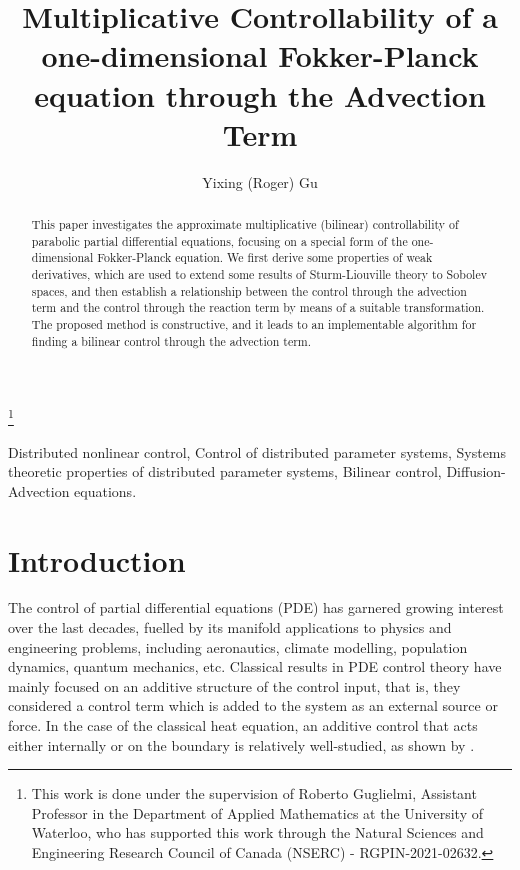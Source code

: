 \documentclass{ifacconf}
\def\RG{}
\begin{document}
\begin{frontmatter}

\title{Multiplicative Controllability \RG{of a one-dimensional Fokker-Planck equation} through the Advection Term 
} 

\thanks[footnoteinfo]{This work is done under the supervision of Roberto Guglielmi, Assistant Professor in the Department of Applied Mathematics at the University of Waterloo, who has supported this work through the Natural Sciences and Engineering Research Council of Canada (NSERC) - RGPIN-2021-02632.}

\author[First]{Yixing (Roger) Gu} 

\address[First]{Faculty of Mathematics, University of Waterloo, Ontario, Canada (e-mail: yixing.gu@uwaterloo.ca).}

\begin{abstract}                %
This paper investigates the approximate multiplicative (bilinear) controllability of parabolic partial differential equations, focusing on a special form of the one-dimensional Fokker-Planck equation. 
We \RG{first derive} some properties of weak derivatives, which are used to extend some results of Sturm-Liouville theory to Sobolev spaces, \RG{and then establish} a relationship between the control through the advection term and the control through the reaction term \RG{by means of a suitable transformation. The proposed method is constructive, and it leads to an implementable} algorithm for finding a bilinear control through the advection term.
\end{abstract}

\begin{keyword}
Distributed nonlinear control, Control of distributed parameter systems, Systems theoretic properties of distributed parameter systems, Bilinear control, Diffusion-Advection equations.
\end{keyword}

\end{frontmatter}

\section{Introduction}
\RG{The control of partial differential equations (PDE) has garnered growing interest over the last decades, fuelled by its manifold applications to physics and engineering problems, including aeronautics, climate modelling, population dynamics, quantum mechanics, etc.
Classical results in PDE control theory have mainly focused on an additive structure of the control input, that is, they considered a control term which} is added to the system as an external source or force. In the case of the classical heat equation, an additive control that acts either internally or on the boundary is relatively well-studied, as shown by \cite{zuazua_controllability_2007, bensoussan_representation_2007}.
\end{document}

